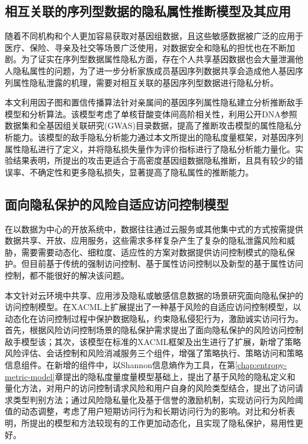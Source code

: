\subsection{相互关联的序列型数据的隐私属性推断模型及其应用}

随着不同机构和个人更加容易获取对基因组数据，且这些敏感数据被广泛的应用于医疗、保险、寻亲及社交等场景广泛使用，对数据安全和隐私的担忧也在不断加剧。为了证实在序列型数据属性隐私方面，存在个人共享基因数据也会大量泄漏他人隐私属性的问题，为了进一步分析家族成员基因序列数据共享会造成他人基因序列属性隐私泄露的机理，需要对相互关联的基因序列型数据进行隐私分析。

本文利用因子图和置信传播算法针对亲属间的基因序列属性隐私建立分析推断敌手模型和分析算法。该模型考虑了单核苷酸变体间高阶相关性，利用公开DNA参照数据集和全基因组关联研究(GWAS)目录数据，提高了推断攻击模型的属性隐私分析能力。该模型的敌手隐私分析能力通过本文所提出的隐私度量框架，对基因序列属性隐私进行了定义，并将隐私损失量作为评价指标进行了隐私分析能力量化。实验结果表明，所提出的攻击更适合于高密度基因组数据隐私推断，且具有较少的错误率、不确定性和更多隐私损失，显著提高了隐私属性的推断能力。

\subsection{面向隐私保护的风险自适应访问控制模型}
在以数据为中心的开放系统中，数据往往通过云服务或其他集中式的方式按需提供数据共享、开放、应用服务，这些需求多样复杂产生了复杂的隐私泄露风险和威胁，需要需要动态化、细粒度、适应性的方案对数据提供访问控制模式的隐私保护。但目前基于传统的强制访问控制、基于属性访问控制以及新型的基于属性访问控制，都不能很好的解决该问题。

本文针对云环境中共享、应用涉及隐私或敏感信息数据的场景研究面向隐私保护的访问控制模型。在XACML上扩展提出了一种基于风险的自适应访问控制模型，以动态化在访问控制过程中保护数据隐私，约束隐私侵犯行为，激励诚实访问行为。首先，根据风险访问控制场景的隐私保护需求提出了面向隐私保护的风险访问控制敌手模型该；其次，该模型在标准的XACML框架及出生进行了扩展，新增了策略风险评估、会话控制和风险消减服务三个组件，增强了策略执行、策略访问和策略信息组件。在新增的组件中，以Shannon信息熵作为工具，在第\ref{chap:entropy-metric-model}章提出的隐私度量度量模型基础上，提出了基于风险的隐私定义和量化方法，对用户的访问控制请求风险和用户自身的风险类型结合，提出了访问请求类型判别方法；通过风险隐私量化及基于信誉的激励机制，实现访问行为风险阈值的动态调整，考虑了用户短期访问行为和长期访问行为的影响。对比和分析表明，所提出的模型和方法较现有的工作更加动态化，且实现了隐私保护，易用性更好。
